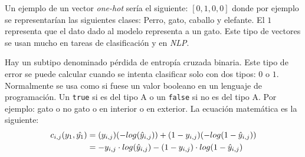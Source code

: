 \begin{itemize}
Un ejemplo de un vector \textit{one-hot} sería el siguiente: $[0,1,0,0]$ donde por ejemplo se representarían las siguientes clases: Perro, gato, caballo y elefante. El $1$ representa que el dato dado al modelo representa a un gato. Este tipo de vectores se usan mucho en tareas de clasificación y en \textit{NLP}.
\newline

Hay un subtipo denominado pérdida de entropía cruzada binaria. Este tipo de error se puede calcular cuando se intenta clasificar solo con dos tipos: $0$ o $1$. Normalmente se usa como si fuese un valor booleano en un lenguaje de programación. Un \verb|true| si es del tipo A o un \verb|false| si no es del tipo A. Por ejemplo: gato o no gato o en interior o en exterior. La ecuación matemática es la siguiente:
\begin{equation}
\centering
    \begin{split}
        c_{i,j}(y_1, \hat{y_1}) &= (y_{i,j})(-log(\hat{y}_{i,j})) + (1-y_{i,j}) (-log(1 - \hat{y}_{i,j})) \\
        &= -y_{i,j} \cdot log(\hat{y}_{i,j}) - (1 - y_{i,j}) \cdot log(1 - \hat{y}_{i,j})
    \end{split}
\end{equation}


\end{itemize}

